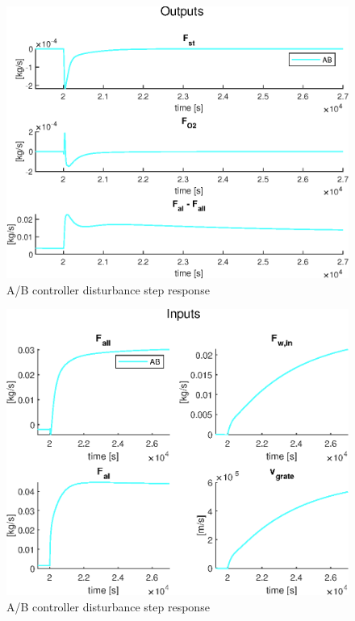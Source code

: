 \noindent


\begin{figure}[!ht]
    \centering
    \includegraphics[width=\textwidth]{img/Fig_dump/outputs_ABStep_Q_all.eps}
    \caption{A/B controller disturbance step response}
    \label{fig:AB_outputs}
\end{figure}

\begin{figure}[!ht]
    \centering
    \includegraphics[width=\textwidth]{img/Fig_dump/inputs_ABStep_Q_all.eps}
    \caption{A/B controller disturbance step response}
    \label{fig:AB_inputs}
\end{figure}

